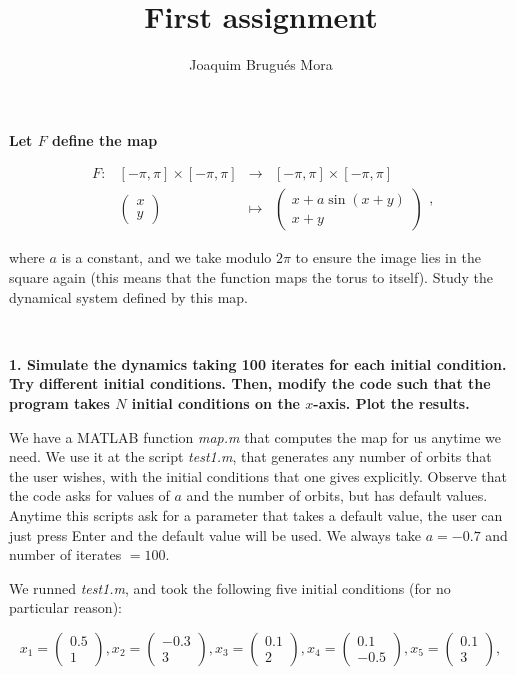 \documentclass[twoside]{article}
\begin{document}
\title{First assignment}
\author{Joaquim Brugués Mora}
\maketitle

{\bf Let $F$ define the map

$$\begin{array}{rccc} F : & [-\pi,\pi] \times [-\pi,\pi] & \longrightarrow & [-\pi,\pi] \times [-\pi,\pi] \\ & \begin{pmatrix} x \\ y \end{pmatrix} & \longmapsto & \begin{pmatrix} x + a \sin(x+y) \\ x+y \end{pmatrix} \end{array} ,$$

where $a$ is a constant, and we take modulo $2\pi$ to ensure the image lies in the square again (this means that the function maps the torus to itself). Study the dynamical system defined by this map.}

\

{\bf 1. Simulate the dynamics taking 100 iterates for each initial condition. Try different initial conditions. Then, modify the code such that the program takes $N$ initial conditions on the $x$-axis. Plot the results.}

We have a MATLAB function {\it map.m} that computes the map for us anytime we need. We use it at the script {\it test1.m}, that generates any number of orbits that the user wishes, with the initial conditions that one gives explicitly. Observe that the code asks for values of $a$ and the number of orbits, but has default values. Anytime this scripts ask for a parameter that takes a default value, the user can just press Enter and the default value will be used. We always take $a=-0.7$ and number of iterates $= 100$.

We runned {\it test1.m}, and took the following five initial conditions (for no particular reason):

$$x_1 = \begin{pmatrix}0.5 \\ 1\end{pmatrix} , x_2 =  \begin{pmatrix} -0.3 \\ 3\end{pmatrix} , x_3 = \begin{pmatrix} 0.1 \\ 2\end{pmatrix} , x_4 = \begin{pmatrix} 0.1 \\ -0.5 \end{pmatrix} , x_5 = \begin{pmatrix} 0.1 \\ 3\end{pmatrix} ,$$
\end{document}
